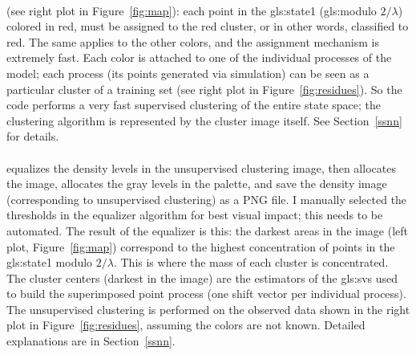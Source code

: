 \documentclass[10pt]{article}
\begin{document}
\quad \\
 (see right plot in Figure~\ref{fig:map}): each point in the \gls{gls:state1} (\gls{gls:modulo} $2/\lambda$) colored in red, must be assigned to the red cluster, or in other words, classified to red. The same applies to the other colors, and the assignment mechanism is extremely fast. Each color is attached to one of the individual processes of the model; each process (its points generated via simulation) can be seen as a particular cluster of a training set
(see right plot in Figure~\ref{fig:residues}).  So the code performs a very fast supervised clustering of the entire state space; the clustering algorithm is represented by the cluster image itself. See Section~\ref{ssnn} for details. \\
\quad \\
 equalizes the density levels in the unsupervised clustering image, then allocates the image, allocates the gray levels in the palette, and save the density image
(corresponding to unsupervised clustering) as a PNG file. I manually selected the thresholds in the equalizer algorithm for best visual
impact; this needs to be automated.  The result of the equalizer is this: the darkest areas in the image (left plot, Figure~\ref{fig:map}) correspond to the highest
concentration of points in the \gls{gls:state1} modulo $2/\lambda$. This is where the mass of each cluster is concentrated. The cluster centers (darkest in the image) are the estimators of the \glspl{gls:sv} used to build the superimposed point process (one shift vector per individual process).
The unsupervised clustering is performed on the observed data shown in the right plot in Figure~\ref{fig:residues}, assuming the colors are not known. Detailed explanations are in Section~\ref{ssnn}.
\end{document}
